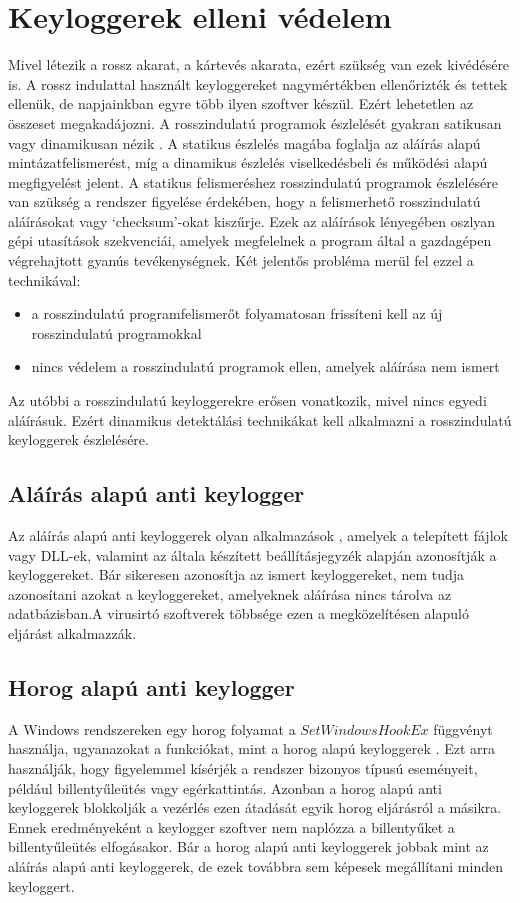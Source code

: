\documentclass[12pt,a4paper,oneside]{report}
\begin{document}
\section{Keyloggerek elleni védelem}
Mivel létezik a rossz akarat, a kártevés akarata, ezért szükség van ezek kivédésére is. A rossz indulattal használt keyloggereket nagymértékben ellenőrizték és tettek ellenük, de napjainkban egyre több ilyen szoftver készül. Ezért lehetetlen az összeset megakadájozni. A rosszindulatú programok észlelését gyakran satikusan vagy dinamikusan nézik  \cite{wood2010keyloggers}. A statikus észlelés magába foglalja az aláírás alapú mintázatfelismerést, míg a dinamikus észlelés viselkedésbeli és működési alapú megfigyelést jelent. A statikus felismeréshez rosszindulatú programok észlelésére van szükség a rendszer figyelése érdekében, hogy a felismerhető rosszindulatú aláírásokat vagy `checksum'-okat kiszűrje. Ezek az aláírások lényegében oszlyan gépi utasítások szekvenciái, amelyek megfelelnek a program által a gazdagépen végrehajtott gyanús tevékenységnek. Két jelentős probléma merül fel ezzel a technikával:
\begin{itemize}
\item a rosszindulatú programfelismerőt folyamatosan frissíteni kell az új rosszindulatú programokkal
\item nincs védelem a rosszindulatú programok ellen, amelyek aláírása nem ismert
\end{itemize}
Az utóbbi a rosszindulatú keyloggerekre erősen vonatkozik, mivel nincs egyedi aláírásuk. Ezért dinamikus detektálási technikákat kell alkalmazni a rosszindulatú keyloggerek észlelésére.

\subsection{Aláírás alapú anti keylogger}
Az aláírás alapú anti keyloggerek olyan alkalmazások \cite{tuli2013system}, amelyek a telepített fájlok vagy DLL-ek, valamint az általa készített beállításjegyzék alapján azonosítják a keyloggereket. Bár sikeresen azonosítja az ismert keyloggereket, nem tudja azonosítani azokat a keyloggereket, amelyeknek aláírása nincs tárolva az adatbázisban.A virusirtó szoftverek többsége ezen a megközelítésen alapuló eljárást alkalmazzák.

\subsection{Horog alapú anti keylogger}
A Windows rendszereken egy horog folyamat a $SetWindowsHookEx$ függvényt használja, ugyanazokat a funkciókat, mint a horog alapú keyloggerek \cite{tuli2013system}. Ezt arra használják, hogy figyelemmel kísérjék a rendszer bizonyos típusú eseményeit, például billentyűleütés vagy egérkattintás. Azonban a horog alapú anti keyloggerek blokkolják a vezérlés ezen átadását egyik horog eljárásról a másikra. Ennek eredményeként a keylogger szoftver nem naplózza a billentyűket a billentyűleütés elfogásakor. Bár a horog alapú anti keyloggerek jobbak mint az aláírás alapú anti keyloggerek, de ezek továbbra sem képesek megállítani minden keyloggert.
\end{document}
